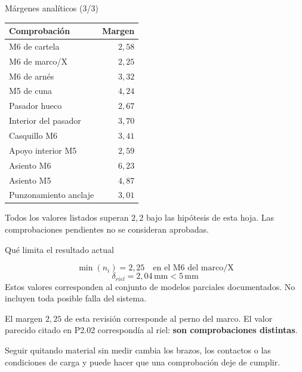 \documentclass[10pt,aspectratio=169]{beamer}
\newcommand{\mm}{\,\mathrm{mm}}
\newcommand{\mcref}{Guía de diseño}
\begin{document}
\gdef\mcref{Mathcad: sección 24 / pág. 40-42}
\begin{frame}[t]{Márgenes analíticos (3/3)}
\small\begin{center}\begin{tabular}{lr}\toprule Comprobación & Margen\\\midrule M6 de cartela & $2{,}58$\\
M6 de marco/X & $2{,}25$\\
M6 de arnés & $3{,}32$\\
M5 de cuna & $4{,}24$\\
Pasador hueco & $2{,}67$\\
Interior del pasador & $3{,}70$\\
Casquillo M6 & $3{,}41$\\
Apoyo interior M5 & $2{,}59$\\
Asiento M6 & $6{,}23$\\
Asiento M5 & $4{,}87$\\
Punzonamiento anclaje & $3{,}01$\\\bottomrule\end{tabular}\end{center} Todos los valores listados superan $2{,}2$ bajo las hipótesis de esta hoja. Las comprobaciones pendientes no se consideran aprobadas.
\end{frame}

\gdef\mcref{Mathcad: sección 24 / pág. 40-42}
\begin{frame}[t]{Qué limita el resultado actual}

\[
\min(n_i)=2{,}25\quad\text{en el M6 del marco/X}
\]
\[
\delta_{riel}=2{,}04\mm<5\mm
\]
Estos valores corresponden al conjunto de modelos parciales documentados. No incluyen toda posible falla del sistema.

El margen $2{,}25$ de esta revisión corresponde al perno del marco. El valor parecido citado en P2.02 correspondía al riel: \textbf{son comprobaciones distintas}.

Seguir quitando material sin medir cambia los brazos, los contactos o las condiciones de carga y puede hacer que una comprobación deje de cumplir.

\end{frame}
\end{document}
